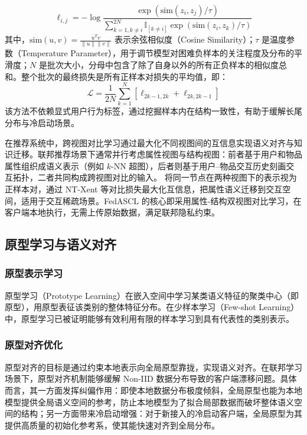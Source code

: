 \begin{equation}
    \ell_{i,j} = - \log \frac{\exp(\text{sim}(z_i, z_j) / \tau)}{\sum_{k=1, k \neq i}^{2N} \mathbb{I}_{[k \neq i]} \exp(\text{sim}(z_i, z_k) / \tau)} 
    \label{eq:contrastive_loss}
\end{equation}
其中，$\text{sim}(u, v) = \frac{u^T v}{\|u\| \|v\|}$ 表示余弦相似度（Cosine Similarity）；$\tau$ 是温度参数（Temperature Parameter），用于调节模型对困难负样本的关注程度及分布的平滑度；$N$ 是批次大小，分母中包含了除了自身以外的所有正负样本的相似度总和。整个批次的最终损失是所有正样本对损失的平均值，即：
\begin{equation}
    \mathcal{L} = \frac{1}{2N} \sum_{k=1}^{N} [\ell_{2k-1, 2k} + \ell_{2k, 2k-1}] 
    \label{eq:total_loss}
\end{equation}
该方法不依赖显式用户行为标签，通过挖掘样本内在结构一致性，有助于缓解长尾分布与冷启动场景\cite{wang2025fedpcl}。

在推荐系统中，跨视图对比学习通过最大化不同视图间的互信息实现语义对齐与知识迁移。联邦推荐场景下通常并行考虑属性视图与结构视图：前者基于用户和物品属性组织成语义表示（例如 $k$-NN 超图），后者则基于用户–物品交互历史刻画交互拓扑，二者共同构成跨视图对比的输入。
将同一节点在两种视图下的表示视为正样本对，通过 NT-Xent 等对比损失最大化互信息，把属性语义迁移到交互空间，适用于交互稀疏场景。FedASCL 的核心即采用属性-结构双视图对比学习，在客户端本地执行，无需上传原始数据，满足联邦隐私约束\cite{crad2025multiview}。

\subsection{原型学习与语义对齐}
\subsubsection{原型表示学习}
原型学习（Prototype Learning）在嵌入空间中学习某类语义特征的聚类中心（即原型），用原型表征该类别的整体特征分布\cite{tan2022fedproto}。在少样本学习（Few-shot Learning）中，原型学习已被证明能够有效利用有限的样本学习到具有代表性的类别表示。

\subsubsection{原型对齐优化}
原型对齐的目标是通过约束本地表示向全局原型靠拢，实现语义对齐。在联邦学习场景下，原型对齐机制能够缓解 Non-IID 数据分布导致的客户端漂移问题。具体而言，其一方面发挥纠偏作用：即使本地数据分布极度倾斜，全局原型也能为本地模型提供全局语义空间的参考，防止本地模型为了拟合局部数据而破坏整体语义空间的结构；另一方面带来冷启动增强：对于新接入的冷启动客户端，全局原型为其提供高质量的初始化参考系，使其能快速对齐到全局分布。

